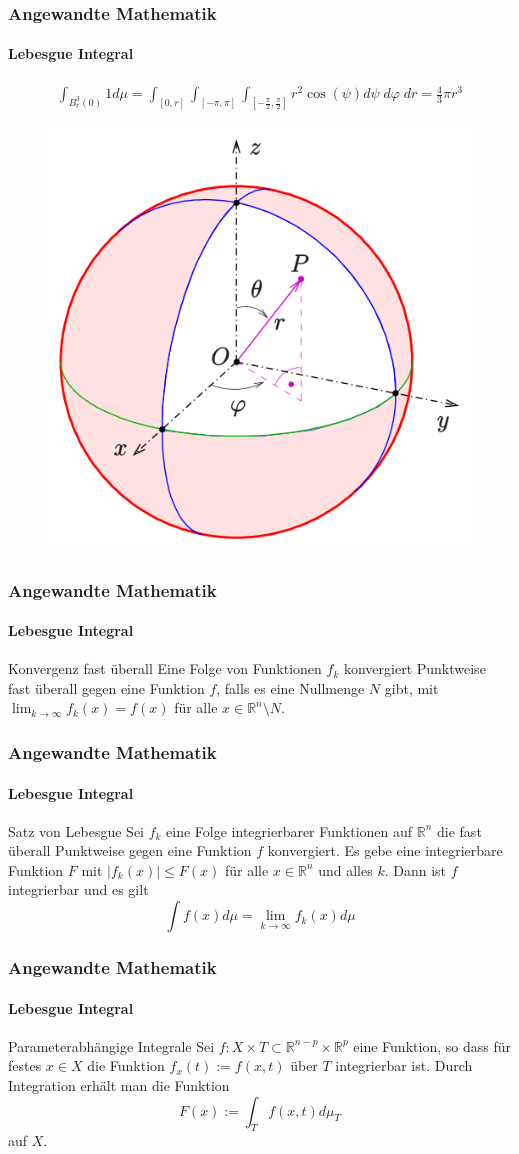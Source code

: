 \documentclass{beamer}
\begin{document}
\begin{frame}
    \frametitle{Angewandte Mathematik}
\framesubtitle{Lebesgue Integral}
\begin{align*}
\int_{B_r^3(0)} 1 d\mu = \int_{ [0,r] } \int_{ [- \pi, \pi]} \int_{[- \frac{\pi}{2}, \frac{\pi}{2}]} r^2 \cos(\psi) d \psi \; d \varphi \; dr = \frac{4} {3} \pi r^3
\end{align*}
\begin{figure}[H]
      \centering
    \includegraphics[width=0.4 \textwidth]{images/500px-Kugelkoord-def}    
\end{figure}
 \end{frame}



\begin{frame}
    \frametitle{Angewandte Mathematik}
\framesubtitle{Lebesgue Integral}
\begin{block}{Konvergenz fast überall}
Eine Folge von Funktionen $f_k$ konvergiert Punktweise fast überall gegen eine Funktion $f$, falls es eine Nullmenge $N$ gibt, mit 
$\lim_{k \to \infty} f_k (x) = f(x)$ für alle $x \in \mathbb{R}^n \setminus N$.
\end{block}
 \end{frame}


\begin{frame}
    \frametitle{Angewandte Mathematik}
\framesubtitle{Lebesgue Integral}
\begin{block}{Satz von Lebesgue}
Sei $f_k$ eine Folge integrierbarer Funktionen auf $\mathbb{R}^n$ die fast überall Punktweise gegen eine Funktion $f$ konvergiert.
Es gebe eine integrierbare Funktion $F$ mit $|f_k (x)| \leq F(x) $ für alle $x \in \mathbb{R}^n$ und alles $k$. Dann ist $f$ integrierbar und es gilt
$$ \int f(x) d \mu = \lim_{k \to \infty} f_k(x) d \mu $$
\end{block}
 \end{frame}



\begin{frame}
    \frametitle{Angewandte Mathematik}
\framesubtitle{Lebesgue Integral}
\begin{block}{Parameterabhängige Integrale}
Sei $f: X \times T \subset \mathbb{R}^{n-p} \times \mathbb{R}^p$ eine Funktion, so dass für festes $x \in X$ die Funktion $f_x(t) := f(x,t)$ über $T$ integrierbar ist. Durch Integration erhält man die Funktion 
$$ F(x) := \int_T f(x,t)  d \mu_T$$ 
auf $X$.
\end{block}
 \end{frame}
\end{document}
